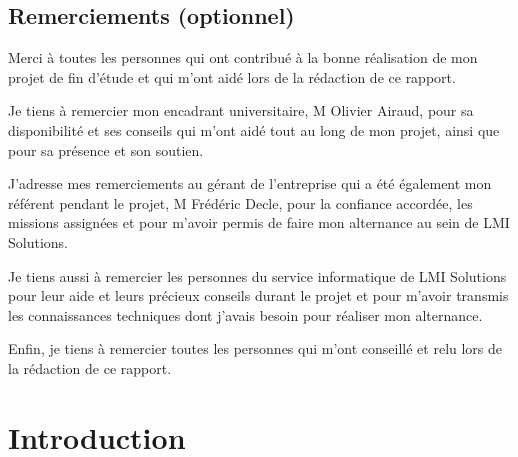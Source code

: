 \documentclass[pfe]{tnreport} %
\begin{document}
\maketitle
{}


\cleardoublepage

\makesecondtitle

\section*{Remerciements (optionnel)}

Merci à toutes les personnes qui ont contribué à la bonne réalisation de mon projet de fin d'étude et qui m'ont aidé lors de la rédaction de ce rapport.

Je tiens à remercier mon encadrant universitaire, M Olivier Airaud, pour sa disponibilité et ses conseils qui m'ont aidé tout au long de mon projet, ainsi que pour sa présence et son soutien.

J'adresse mes remerciements au gérant de l'entreprise qui a été également mon référent pendant le projet, M Frédéric Decle, pour la confiance accordée, les missions assignées et pour m'avoir permis de faire mon alternance au sein de LMI Solutions.

Je tiens aussi à remercier les personnes du service informatique de LMI Solutions pour leur aide 
et leurs précieux conseils durant le projet et pour m'avoir transmis les connaissances techniques dont j’avais besoin pour réaliser mon alternance.

Enfin, je tiens à remercier toutes les personnes qui m'ont conseillé et relu lors de la rédaction de ce rapport.


\cleardoublepage

\renewcommand{\baselinestretch}{0.5}\normalsize
\tableofcontents
\renewcommand{\baselinestretch}{1.2}\normalsize
\cleardoublepage

\setcounter{page}{1}

\chapter{Introduction}
\end{document}
